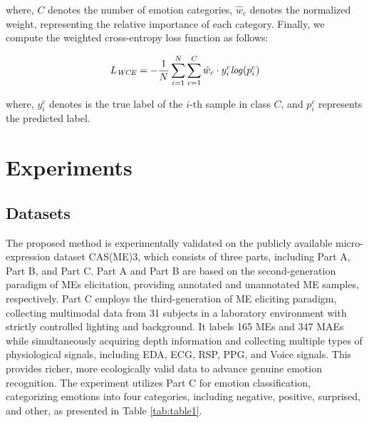 \documentclass[lettersize,journal]{IEEEtran}
\begin{document}
\noindent where, $C$ denotes the number of emotion categories, $\hat{w}_c$ denotes the normalized weight, representing the relative importance of each category. Finally, we compute the weighted cross-entropy loss function as follows:

\begin{equation}
\label{eq_16}
L_{\mathit{WCE}}
=
-\frac{1}{N}
\sum_{i=1}^{N}
\sum_{c=1}^{C}
\hat{w}_c \cdot y_i^{c} \\{\mathit{log}\!\left(p_i^{c}\right)}
\end{equation}

\noindent where, $y_i^{c}$ denotes is the true label of the $i\text{-th}$ sample in class $C$, and $p_i^{c}$ represents the predicted label.


\section{Experiments}

\subsection{Datasets}

The proposed method is experimentally validated on the publicly available micro-expression dataset CAS(ME)3, which consists of three parts, including Part A, Part B, and Part C. Part A and Part B are based on the second-generation paradigm of MEs elicitation, providing annotated and unannotated ME samples, respectively. Part C employs the third-generation of ME eliciting paradigm, collecting multimodal data from 31 subjects in a laboratory environment with strictly controlled lighting and background. It labels 165 MEs and 347 MAEs while simultaneously acquiring depth information and collecting multiple types of physiological signals, including EDA, ECG, RSP, PPG, and Voice signals. This provides richer, more ecologically valid data to advance genuine emotion recognition. The experiment utilizes Part C for emotion classification, categorizing emotions into four categories, including negative, positive, surprised, and other, as presented in Table \ref{tab:table1}.
\end{document}
